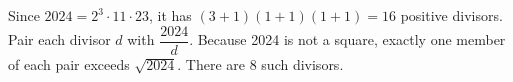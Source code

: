 Since $2024=2^3\cdot11\cdot23$, it has $(3+1)(1+1)(1+1)=16$ positive divisors. Pair each divisor $d$ with $\dfrac{2024}{d}$. Because 2024 is not a square, exactly one member of each pair exceeds $\sqrt{2024}$. There are $\boxed8$ such divisors.
